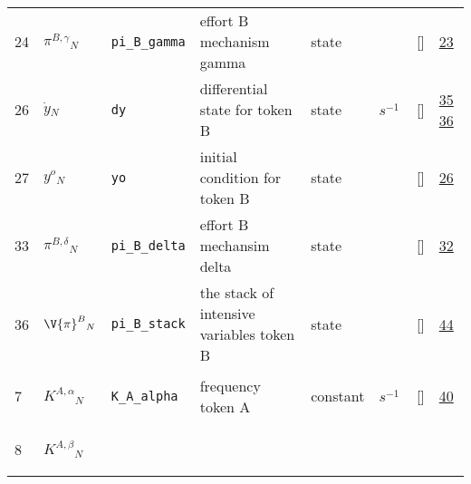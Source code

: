 \begin{longtable}{|p{1cm}|p{3cm}|p{3cm}|p{7cm}|p{3.0cm}|p{3cm}|p{2cm}|p{1cm}|}
                 \\
    24
             & \hypertarget{"v:24"}{ $ {{\pi^{B,\gamma}}}{_{N}} $}
             & \verb|pi_B_gamma|
             & effort B mechanism gamma
             & \begin{lay}state \end{lay}
             & $  $
             & []
             & \hyperlink{"e:23"}{ 23 }
                 \\
    26
             & \hypertarget{"v:26"}{ $ {{\dot{y}}}{_{N}} $}
             & \verb|dy|
             & differential state for token B
             & \begin{lay}state \end{lay}
             & $ s^{-1} \, $
             & []
             & \hyperlink{"e:35"}{ 35 }
                 \hyperlink{"e:36"}{ 36 }
                 \\
    27
             & \hypertarget{"v:27"}{ $ {{y^{o}}}{_{N}} $}
             & \verb|yo|
             & initial condition for token B
             & \begin{lay}state \end{lay}
             & $  $
             & []
             & \hyperlink{"e:26"}{ 26 }
                 \\
    33
             & \hypertarget{"v:33"}{ $ {{\pi^{B,\delta}}}{_{N}} $}
             & \verb|pi_B_delta|
             & effort B mechansim delta
             & \begin{lay}state \end{lay}
             & $  $
             & []
             & \hyperlink{"e:32"}{ 32 }
                 \\
    36
             & \hypertarget{"v:36"}{ $ {{\V{\pi}^{B}}}{_{N}} $}
             & \verb|pi_B_stack|
             & the stack of intensive variables token B
             & \begin{lay}state \end{lay}
             & $  $
             & []
             & \hyperlink{"e:44"}{ 44 }
                 \\
    7
             & \hypertarget{"v:7"}{ $ {{K^{A,\alpha}}}{_{N}} $}
             & \verb|K_A_alpha|
             & frequency token A
             & \begin{lay}constant \end{lay}
             & $ s^{-1} \, $
             & []
             & \hyperlink{"e:40"}{ 40 }
                 \\
    8
             & \hypertarget{"v:8"}{ $ {{K^{A,\beta}}}{_{N}} $}

\end{longtable}
